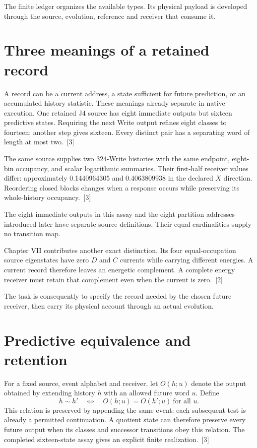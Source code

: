 \documentclass[10pt,twocolumn,letterpaper]{article}
\begin{document}
The finite ledger organizes the available types. Its physical payload is developed through the source, evolution, reference and receiver that consume it.

\section{Three meanings of a retained record}
A record can be a current address, a state sufficient for future prediction, or an accumulated history statistic. These meanings already separate in native execution. One retained J4 source has eight immediate outputs but sixteen predictive states. Requiring the next Write output refines eight classes to fourteen; another step gives sixteen. Every distinct pair has a separating word of length at most two.~[3]

The same source supplies two 324-Write histories with the same endpoint, eight-bin occupancy, and scalar logarithmic summaries. Their first-half receiver values differ: approximately 0.1440964305 and 0.4063809938 in the declared $X$ direction. Reordering closed blocks changes when a response occurs while preserving its whole-history occupancy.~[3]

The eight immediate outputs in this assay and the eight partition addresses introduced later have separate source definitions. Their equal cardinalities supply no transition map.

Chapter VII contributes another exact distinction. Its four equal-occupation source eigenstates have zero $D$ and $C$ currents while carrying different energies. A current record therefore leaves an energetic complement. A complete energy receiver must retain that complement even when the current is zero.~[2]

The task is consequently to specify the record needed by the chosen future receiver, then carry its physical account through an actual evolution.

\section{Predictive equivalence and retention}
For a fixed source, event alphabet and receiver, let $O(h;u)$ denote the output obtained by extending history $h$ with an allowed future word $u$. Define
\[
h\sim h' \quad\Longleftrightarrow\quad O(h;u)=O(h';u)\ \text{for all }u.
\]
This relation is preserved by appending the same event: each subsequent test is already a permitted continuation. A quotient state can therefore preserve every future output when its classes and successor transitions obey this relation. The completed sixteen-state assay gives an explicit finite realization.~[3]
\end{document}
